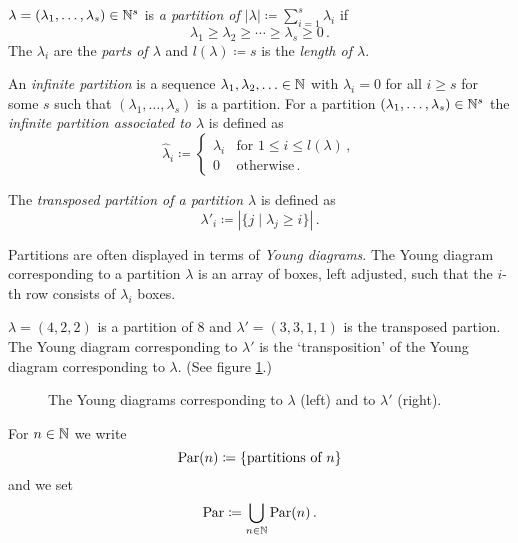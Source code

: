 \begin{defi}
  $\lambda = (\lambda_1, \dotsc, \lambda_s) \in \mathbb{N}^s$ is \emph{a partition of $|\lambda| \coloneqq \sum_{i=1}^s \lambda_i$} if
  \[
          \lambda_1
    \geq  \lambda_2
    \geq  \dotsb
    \geq  \lambda_s
    \geq  0 \,.
  \]
  The $\lambda_i$ are the \emph{parts of $\lambda$} and $l(\lambda) \coloneqq s$ is the \emph{length of $\lambda$}.
  
  An \emph{infinite partition} is a sequence $\lambda_1, \lambda_2, \dotsc \in \mathbb{N}$ with $\lambda_i = 0$ for all $i \geq s$ for some $s$ such that $(\lambda_1, \dotsc, \lambda_s)$ is a partition.
  For a partition $(\lambda_1, \dotsc, \lambda_s) \in \mathbb{N}^s$ the \emph{infinite partition associated to $\lambda$} is defined as
  \[
              \hat{\lambda}_i
    \coloneqq \begin{cases}
                \lambda_i & \text{for } 1 \leq i \leq l(\lambda) \,,  \\
                        0 & \text{otherwise} \,.
              \end{cases}
  \]
  
  The \emph{transposed partition of a partition $\lambda$} is defined as
  \[
              \lambda'_i
    \coloneqq |\{j \mid \lambda_j \geq i\}| \,.
  \]
\end{defi}


Partitions are often displayed in terms of \emph{Young diagrams}.
The Young diagram corresponding to a partition $\lambda$ is an array of boxes, left adjusted, such that the $i$-th row consists of $\lambda_i$ boxes.


\begin{expl}
  $\lambda = (4,2,2)$ is a partition of $8$ and $\lambda' = (3,3,1,1)$ is the transposed partion.
  The Young diagram corresponding to $\lambda'$ is the `transposition' of the Young diagram corresponding to $\lambda$.
  (See figure \ref{fig: Young diagram example}.)
  \begin{figure}
    \centering
    \qquad
    \caption{The Young diagrams corresponding to $\lambda$ (left) and to $\lambda'$ (right).}
    \label{fig: Young diagram example}
  \end{figure}
\end{expl}


\begin{defi}
  For $n \in \mathbb{N}$ we write
  \[
              \operatorname{Par}(n)
    \coloneqq \{\text{partitions of $n$}\}
  \]
  and we set
  \[
              \operatorname{Par}
    \coloneqq \bigcup_{n \in \mathbb{N}} \operatorname{Par}(n) \,.
  \]
\end{defi}
  

